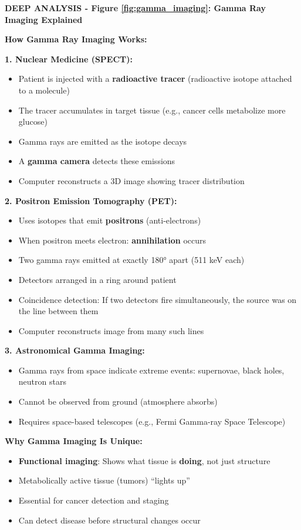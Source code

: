\documentclass[12pt,a4paper]{article}
\begin{document}
\begin{deepexplanation}
\textbf{DEEP ANALYSIS - Figure \ref{fig:gamma_imaging}: Gamma Ray Imaging Explained}

\textbf{How Gamma Ray Imaging Works:}

\textbf{1. Nuclear Medicine (SPECT):}
\begin{itemize}
    \item Patient is injected with a \textbf{radioactive tracer} (radioactive isotope attached to a molecule)
    \item The tracer accumulates in target tissue (e.g., cancer cells metabolize more glucose)
    \item Gamma rays are emitted as the isotope decays
    \item A \textbf{gamma camera} detects these emissions
    \item Computer reconstructs a 3D image showing tracer distribution
\end{itemize}

\textbf{2. Positron Emission Tomography (PET):}
\begin{itemize}
    \item Uses isotopes that emit \textbf{positrons} (anti-electrons)
    \item When positron meets electron: \textbf{annihilation} occurs
    \item Two gamma rays emitted at exactly 180° apart (511 keV each)
    \item Detectors arranged in a ring around patient
    \item Coincidence detection: If two detectors fire simultaneously, the source was on the line between them
    \item Computer reconstructs image from many such lines
\end{itemize}

\textbf{3. Astronomical Gamma Imaging:}
\begin{itemize}
    \item Gamma rays from space indicate extreme events: supernovae, black holes, neutron stars
    \item Cannot be observed from ground (atmosphere absorbs)
    \item Requires space-based telescopes (e.g., Fermi Gamma-ray Space Telescope)
\end{itemize}

\textbf{Why Gamma Imaging Is Unique:}
\begin{itemize}
    \item \textbf{Functional imaging}: Shows what tissue is \textbf{doing}, not just structure
    \item Metabolically active tissue (tumors) ``lights up''
    \item Essential for cancer detection and staging
    \item Can detect disease before structural changes occur
\end{itemize}
\end{deepexplanation}
\end{document}
